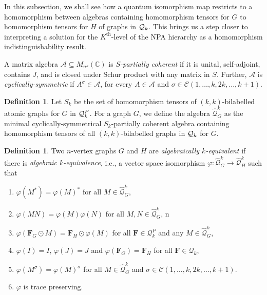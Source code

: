 \documentclass[11pt,a4paper]{article}
\theoremstyle{plain}
\theoremstyle{remark}
\theoremstyle{definition}
\newtheorem{definition}[thm]{Definition}
\newcommand{\complex}{\mathbb{C}}
\def\calA{{\mathcal A}} \def\calB{{\mathcal B}} \def\calC{{\mathcal C}}
\newcommand{\cyclicpermutations}{\mathscr{C}(1,\dots, k, 2k, \dots, k+1)}
\begin{document}
 In this subsection, we shall see how a quantum isomorphism map restricts to a homomorphism between algebras containing homomorphism tensors for $G$ to homomorphism tensors for $H$ of graphs in ${\mathcal Q}_k$. This brings us a step closer to interpreting a solution for the $K^{\text{th}}$-level of the NPA hierarchy as a homomorphism indistinguishability result. 

A matrix algebra $\calA \subseteq M_{n^k}(\complex)$ is \emph{$S$-partially coherent} if it is unital, self-adjoint, contains $J$, and is closed under Schur product with any matrix in $S$. 
Further, $\calA$ is \emph{cyclically-symmetric} if $A^\sigma \in \calA$, for every $A \in \calA$ and $\sigma \in \cyclicpermutations$.

\begin{definition}
  Let $S_k$ be the set of homomorphism tensors of $(k, k)$-bilabelled atomic graphs for $G$ in ${\mathcal Q}_k^P$.
  For a graph $G$, we define the algebra $\widehat{\mathcal{Q}}_G^k$ as the minimal cyclically-symmetrical $S_k$-partially coherent algebra containing homomorphism tensors of all $(k,k)$-bilabelled graphs in ${\mathcal Q}_k$ for $G$.
\end{definition}


\begin{definition}\label{def:algebraic-k-quiv}
  Two $n$-vertex graphs $G$ and $H$ are \emph{algebraically $k$-equivalent} if there is \emph{algebraic $k$-equivalence}, i.e., a vector space isomorphism $\varphi\colon \widehat{\mathcal{Q}}_G^k \to \widehat{\mathcal{Q}}_H^k$ such that
  \begin{enumerate}
    \item $\varphi(M^*) = \varphi(M)^*$ for all $M\in\widehat{\mathcal{Q}}_G^k$,
    \item $\varphi(MN) = \varphi(M)\varphi(N)$ for all $M,N\in\widehat{\mathcal{Q}}_G^k$,
n    \item $\varphi(\boldsymbol{F}_G \odot M) = \boldsymbol{F}_H\odot\varphi(M)$ for all 
    $\boldsymbol{F}\in\mathcal{Q}_k^P$ and any $M\in\widehat{\mathcal{Q}}_G^k$,
    \item $\varphi(I) = I$, $\varphi(J) = J$  and $\varphi(\boldsymbol{F}_G) = \boldsymbol{F}_H$ for all $\boldsymbol{F}\in\mathcal{Q}_k$,
    \item $\varphi(M^\sigma) = \varphi(M)^\sigma$ for all $M\in\widehat{\mathcal{Q}}_G^k$ and $\sigma \in \cyclicpermutations$.
    \item $\varphi$ is trace preserving. 
  \end{enumerate}
\end{definition}
\end{document}
